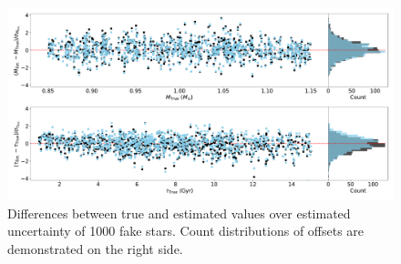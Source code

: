 \begin{figure}
	\includegraphics[width=1.8\columnwidth]{fake-stars-test-2.pdf}
    \caption{Differences between true and estimated values over estimated uncertainty of 1000 fake stars. Count distributions of offsets are demonstrated on the right side.} 
  \label{fig:fake_test}
\end{figure}









